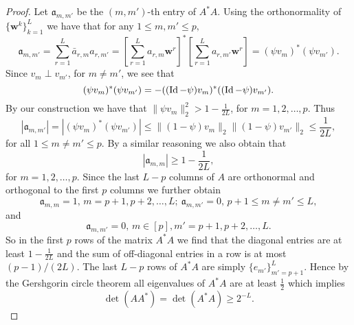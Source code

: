 \documentclass{amsart}
\numberwithin{equation}{section}
\def\corAB{}
\begin{document}
\begin{proof}
\corAB{Let $\mathfrak{a}_{m, m'}$ be the $(m,m')$-th entry of $A^*A$. Using the orthonormality of $\{{\bm w}^k\}_{k=1}^L$ we have that for any $1\leq m,m' \leq p,$
\[
  \mathfrak{a}_{m, m'}=    \sum_{r=1}^L \bar{a}_{r,m} a_{r,m'}
  =
  \left[\sum_{r=1}^L a_{r,m} {\bm w}^r\right]^*
  \left[\sum_{r=1}^L a_{r,m'} {\bm w}^r\right]
  = ({\psi} v_m)^*({\psi} v_{m'}).
\]}
\corAB{Since $v_m \perp v_{m'}$, for $m \neq m'$, we see that
\[
  ({\psi} v_m)^*({\psi} v_{m'})
  = - ((\operatorname{Id}-{\psi})v_m)^*( (\operatorname{Id}-{\psi})v_{m'}).
\]
By our construction we have that
\(
  \|{\psi} v_m\|^2_2 > 1-\frac{1}{2L}
\),
for $m=1,2,\ldots,p$. Thus
\[
|\mathfrak{a}_{m,m'}| = |({\psi} v_m)^*({\psi} v_{m'})| \leq
\|(1 - {\psi})v_m\|_2
\|(1 - {\psi})v_{m'}\|_2 \leq \frac{1}{2L},
\]
for all $1 \le m \ne m' \le p$. By a similar reasoning we also obtain that
\[
|\mathfrak{a}_{m,m}| \ge 1 - \frac{1}{2L},
\]
for $m=1,2,\ldots,p$. Since the last $L-p$ columns of $A$ are orthonormal and orthogonal to the first $p$ columns we further obtain
\[
\mathfrak{a}_{m,m} =1, \, m=p+1,p+2,\ldots,L; \ \mathfrak{a}_{m,m'} =0, \, p+1 \le m \ne m' \le L,
\]
and
\[
 \mathfrak{a}_{m,m'}=0, \, m \in [p], m'=p+1,p+2,\ldots, L.
\]
So in the first $p$ rows of the matrix $A^*A$ we find that the diagonal entries are at least $1-\frac{1}{2L}$ and the sum of off-diagonal entries in a row is at most $(p-1)/(2L)$. The last $L-p$ rows of $A^*A$ are simply $\{e_{m'}\}_{m'=p+1}^L$. Hence by the Gershgorin circle theorem all eigenvalues of $A^*A$ are at least $\tfrac{1}{2}$ which implies
\begin{equation}\label{eq:detAA*}
\det(A A^*)=  \det (A^*A)
  \geq 2^{-L}.
\end{equation}}

\end{proof}
\end{document}

